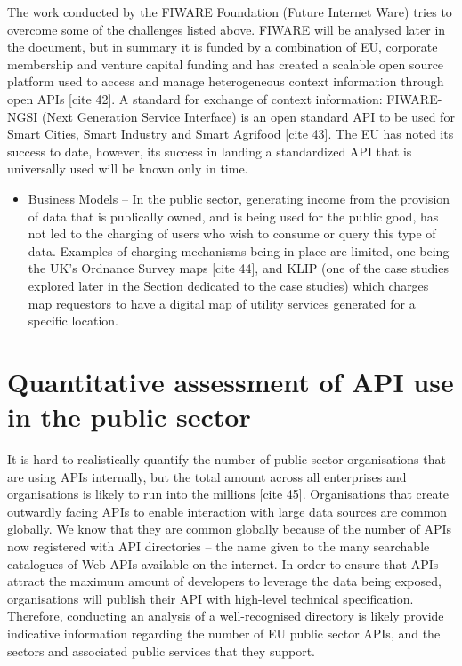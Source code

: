 The work conducted by the FIWARE Foundation (Future Internet Ware) tries to
overcome some of the challenges listed above. FIWARE will be analysed later
in the document, but in summary it is funded by a combination of EU, corporate
membership and venture capital funding and has created a scalable open source
platform used to access and manage heterogeneous context information through
open APIs [cite 42]. A standard for exchange of context information: FIWARE-NGSI
(Next Generation Service Interface) is an open standard API to be used for Smart
Cities, Smart Industry and Smart Agrifood [cite 43]. The EU has noted its success to
date, however, its success in landing a standardized API that is universally
used will be known only in time.
\begin{itemize}
	\item Business Models – In the public sector, generating income from the
	provision of data that is publically owned, and is being used for the
	public good, has not led to the charging of users who wish to consume
	or query this type of data. Examples of charging mechanisms being in place
	are	limited, one being the UK’s Ordnance Survey maps [cite 44], and KLIP (one of
	the case studies explored later in the Section dedicated to the case studies)
	which charges map requestors to have a digital map of utility services
	generated for a specific location. 
\end{itemize}

\section{Quantitative assessment of API use in the public sector}

It is hard to realistically quantify the number of public sector organisations
that are using APIs internally, but the total amount across all enterprises
and organisations is likely to run into the millions [cite 45]. Organisations
that create outwardly facing APIs to enable interaction with large data sources
are common globally. We know that they are common globally because of the
number of APIs now registered with API directories – the name given to the
many searchable catalogues of Web APIs available on the internet. In order
to ensure that APIs attract the maximum amount of developers to leverage the
data being exposed, organisations will publish their API with high-level
technical specification. Therefore, conducting an analysis of a well-recognised
directory is likely provide indicative information regarding the number of EU
public sector APIs, and the sectors and associated public services that they support.

